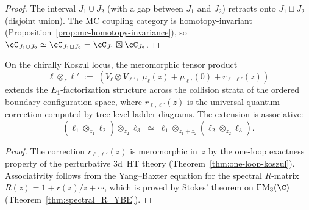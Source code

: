 \begin{proof}
The interval $J_1 \cup J_2$ (with a gap between $J_1$ and $J_2$)
retracts onto $J_1 \sqcup J_2$ (disjoint union). The MC
coupling category is homotopy-invariant
(Proposition~\ref{prop:mc-homotopy-invariance}), so
$\cC_{J_1 \cup J_2} \simeq \cC_{J_1 \sqcup J_2}
= \cC_{J_1} \boxtimes \cC_{J_2}$.
\end{proof}

\begin{theorem}
\label{thm:collision-extension}
On the chirally Koszul locus, the meromorphic tensor product
\[
 \ell \otimes_z \ell'
 \;:=\;
 (V_\ell \otimes V_{\ell'},\;
 \mu_\ell(z) + \mu_{\ell'}(0) + r_{\ell,\ell'}(z))
\]
extends the $E_1$-factorization structure across the collision
strata of the ordered boundary configuration space, where
$r_{\ell,\ell'}(z)$ is the universal quantum correction computed
by tree-level ladder diagrams. The extension is associative:
\[
 (\ell_1 \otimes_{z_1} \ell_2) \otimes_{z_2} \ell_3
 \;\simeq\;
 \ell_1 \otimes_{z_1 + z_2} (\ell_2 \otimes_{z_2} \ell_3).
\]
\end{theorem}

\begin{proof}
The correction $r_{\ell,\ell'}(z)$ is meromorphic in~$z$ by the
one-loop exactness property of the perturbative 3d~HT theory
(Theorem~\ref{thm:one-loop-koszul}). Associativity follows from
the Yang--Baxter equation for the spectral $R$-matrix
$R(z) = 1 + r(z)/z + \cdots$, which is proved by Stokes' theorem
on $\FM_3(\C)$
(Theorem~\ref{thm:spectral_R_YBE}).
\end{proof}

